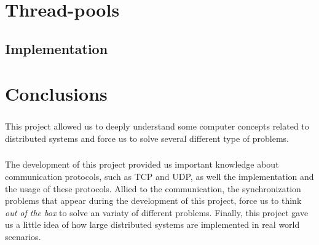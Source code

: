 \documentclass{report}
\begin{document}
	        \paragraph{}
	        
	        \paragraph{}

	\chapter{Thread-pools}
	
	        \paragraph{}
	        
	        \paragraph{}

			\section{Implementation}
	
				\paragraph{}
				
				\paragraph{}

	\chapter{Conclusions}
	
	        \paragraph{}This project allowed us to deeply understand some computer concepts
			related to distributed systems and force us to solve several different type of 
			problems. 
	        
	        \paragraph{} The development of this project provided us important knowledge
			about communication protocols, such as TCP and UDP, as well the implementation and
			the usage of these protocols. Allied to the communication, the synchronization 
			problems that appear during the development of this project, force us to think 
			\emph{out of the box} to solve an variaty of different problems. Finally, this 
			project gave us a little idea of how large distributed systems are implemented
			in real world scenarios. 
\end{document}
